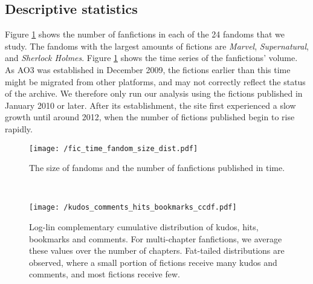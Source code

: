 \documentclass[letterpaper]{article} %
\begin{document}
\subsection*{Descriptive statistics}

Figure \ref{fig:fandom_size} shows the number of fanfictions in each of the 24 fandoms that we study. The fandoms with the largest amounts of fictions are \emph{Marvel}, \emph{Supernatural}, and \emph{Sherlock Holmes}. Figure \ref{fig:fandom_size}  shows the time series of the fanfictions' volume. As AO3 was established in December 2009, the fictions earlier than this time might be migrated from other platforms, and may not correctly reflect the status of the archive. We therefore only run our analysis using the fictions published in January 2010 or later. After its establishment, the site first experienced a slow growth until around 2012, when the number of fictions published begin to rise rapidly. 


\begin{figure*}
    \centering
    \begin{subfigure}[b]{\textwidth}
    \hspace{2cm}
        \texttt{[image: /fic\_time\_fandom\_size\_dist.pdf]}
        \caption{The size of fandoms and the number of fanfictions published in time.}
        \label{fig:fandom_size}
    \end{subfigure}
    ~ %
    \begin{subfigure}[b]{\textwidth}
            \texttt{[image: /kudos\_comments\_hits\_bookmarks\_ccdf.pdf]}
        \caption{Log-lin complementary cumulative distribution of kudos, hits, bookmarks and comments. For multi-chapter fanfictions, we average these values over the number of chapters. Fat-tailed distributions are observed, where a small portion of fictions receive many kudos and comments, and most fictions receive few.}
        \label{fig:kudos_dist}
    \end{subfigure}
\end{figure*}
\end{document}
